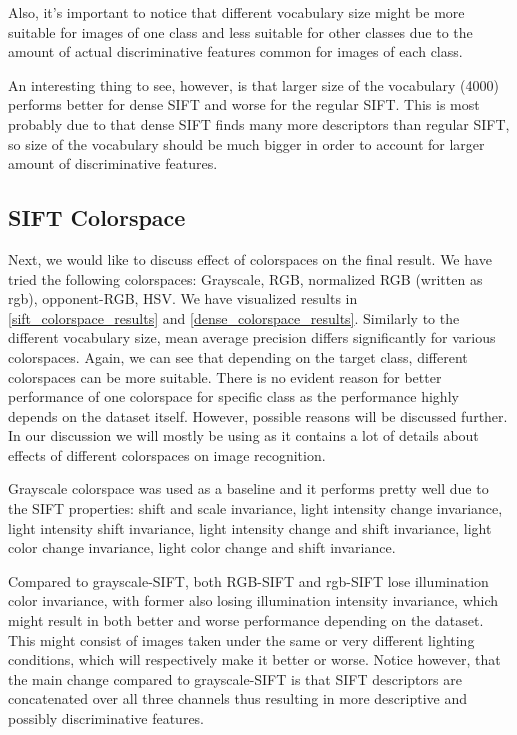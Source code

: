 \documentclass{article}
\begin{document}
Also, it's important to notice that different vocabulary size might be more suitable for images of one class and less suitable for other classes due to the amount of actual discriminative features common for images of each class.

An interesting thing to see, however, is that larger size of the vocabulary (4000) performs better for dense SIFT and worse for the regular SIFT. This is most probably due to that dense SIFT finds many more descriptors than regular SIFT, so size of the vocabulary should be much bigger in order to account for larger amount of discriminative features.

\subsection{SIFT Colorspace}

Next, we would like to discuss effect of colorspaces on the final result. We have tried the following colorspaces: Grayscale, RGB, normalized RGB (written as rgb), opponent-RGB, HSV. We have visualized results in \cref{sift_colorspace_results} and \cref{dense_colorspace_results}. Similarly to the different vocabulary size, mean average precision differs significantly for various colorspaces. Again, we can see that depending on the target class, different colorspaces can be more suitable. There is no evident reason for better performance of one colorspace for specific class as the performance highly depends on the dataset itself. However, possible reasons will be discussed further. In our discussion we will mostly be using \cite{colorspaces} as it contains a lot of details about effects of different colorspaces on image recognition.

Grayscale colorspace was used as a baseline and it performs pretty well due to the SIFT properties: shift and scale invariance, light intensity change invariance, light intensity shift invariance, light intensity change and shift invariance, light color change invariance, light color change and shift invariance. 

Compared to grayscale-SIFT, both RGB-SIFT and rgb-SIFT lose illumination color invariance, with former also losing illumination intensity invariance, which might result in both better and worse performance depending on the dataset. This might consist of images taken under the same or very different lighting conditions, which will respectively make it better or worse. Notice however, that the main change compared to grayscale-SIFT is that SIFT descriptors are concatenated over all three channels thus resulting in more descriptive and possibly discriminative features.
\end{document}
